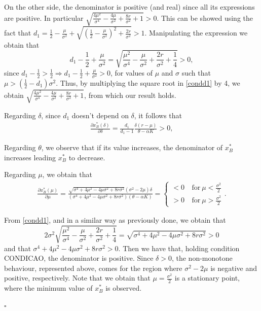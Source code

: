 On the other side, the denominator is positive (and real) since all its expressions are positive. In particular $\sqrt{\frac{4 \mu ^2}{\sigma ^4}-\frac{4 \mu }{\sigma ^2}+\frac{8 r}{\sigma ^2}+1}>0$.
This can be showed using the fact that $d_1=\frac{1}{2}-\frac{\mu}{\sigma^2} +\sqrt{\left( \frac{1}{2} -\frac{\mu}{\sigma^2} \right) ^2+ \frac{2r}{\sigma^2}}>1$. Manipulating the expression we obtain that
\begin{equation}
 d_1-\frac{1}{2}+\frac{\mu}{\sigma^2}= \sqrt{ \frac{\mu^2}{\sigma^4}-\frac{\mu}{\sigma^2} +\frac{2r}{\sigma^2}+\frac{1}{4} }>0,
 \label{condd1}
\end{equation}
 since $d_1-\frac{1}{2}>\frac{1}{2} \Rightarrow d_1-\frac{1}{2}+\frac{\mu}{\sigma^2}>0$, for values of $\mu$ and $\sigma$ such that $\mu>\left( \frac{1}{2}-d_1 \right) \sigma^2$. Thus, by multiplying the square root in \eqref{condd1} by 4, we obtain  $\sqrt{\frac{4 \mu ^2}{\sigma ^4}-\frac{4 \mu }{\sigma ^2}+\frac{8 r}{\sigma ^2}+1}$, from which our result holds.
 
 
 Regarding $\delta$, since $d_1$ doesn't depend on $\delta$, it follows that
 \begin{align*}
 \frac{\partial x^*_B (\delta)}{\partial \delta}= \frac{d_1}{d_1-1} \frac{\delta (r-\mu)}{\theta-\alpha K}>0,
 \end{align*}
 
 
 Regarding $\theta$, we observe that if its value increases, the denominator of $x^*_B$ increases leading $x^*_B$ to decrease.
 
 Regarding $\mu$, we obtain that
 \begin{align*}
 \frac{\partial x^*_B (\mu)}{\partial \mu}=\frac{\sqrt{\sigma^4+4 \mu^2 -4 \mu\sigma^2+8r\sigma^2}(\sigma^2-2\mu)\delta}{(\sigma^4+4 \mu^2 -4 \mu\sigma^2+8r\sigma^2)(\theta-\alpha K )} =
 \begin{cases}
 <0 &\ \text{for} \ \mu<\frac{\sigma^2}{2}\\
 >0 &\ \text{for} \ \mu>\frac{\sigma^2}{2}
 \end{cases}.
 \end{align*}
 
 From \eqref{condd1}, and in a similar way as previously done, we obtain that
 $$2 \sigma^2 \sqrt{ \frac{\mu^2}{\sigma^4}-\frac{\mu}{\sigma^2} +\frac{2r}{\sigma^2}+\frac{1}{4} }= \sqrt{ \sigma^4+4 \mu^2 -4 \mu\sigma^2+8r\sigma^2}>0$$
 and that $\sigma^4+4 \mu^2 -4 \mu\sigma^2+8r\sigma^2>0$. Then we have that, holding condition CONDICAO, the denominator is positive. Since $\delta>0$, the non-monotone behaviour, represented above, comes for the region where $\sigma^2-2\mu$ is negative and positive, respectively. Note that we obtain that $\mu=\frac{\sigma^2}{2}$ is a stationary point, where the minimum value of $x^*_B$ is observed.
\begin{flushright}
 $\square$
\end{flushright}



